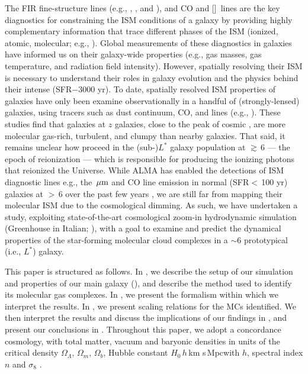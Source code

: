 \IfFileExists{emulateapjlegacy.cls}{\documentclass[iop]{emulateapjlegacy}}{\documentclass[iop]{emulateapj}}
\begin{document}
The FIR fine-structure lines (e.g., \cii, \nii, and \oiii), and CO and [\ci]~lines are the key diagnostics for
constraining the ISM conditions of a galaxy by
providing highly complementary information that trace different phases of the ISM (ionized,
atomic, molecular; e.g., \citealt{Scoville74a, Rubin85a, Malhotra01a}).
Global measurements of these diagnostics in \highz galaxies
have informed us on their galaxy-wide properties (e.g.,
gas masses, gas temperature, and radiation field intensity).
However, spatially resolving their ISM is necessary to understand their roles in galaxy evolution and
the physics behind their intense \SF (SFR$-$3000\,\Msun\,yr\pmOne).
To date, spatially resolved ISM properties of \highz galaxies
have only been examine observationally in a handful of (strongly-lensed)
galaxies, using tracers such as
dust continuum, CO, and \cii lines (e.g., \citealt{Swinbank11a, Hodge15a, Ferkinhoff15a, Hodge16a, Leung19a}).
These studies find that galaxies at $z$ galaxies, close to the peak of cosmic \SF, are more
molecular gas-rich, turbulent, and clumpy than nearby galaxies.
That said, it remains unclear how \SF proceed in the (sub-)$L^*$ galaxy population at \z$\gtrsim$\,6 ---
the epoch of reionization  ---
which is responsible for producing the
ionizing photons that reionized the Universe.
While ALMA has enabled the detections of
ISM diagnostic lines e.g., the \,$\mbox{$\mu$m}$ and CO line emission in
normal (SFR$<$\,100\,\Msun\,yr\pmOne) galaxies at \z$>$\,6 over the past few years \citep[e.g.,][]{Odorico18a, Carniani18b},
we are still far from mapping their molecular ISM due to the cosmological dimming.
As such, we have undertaken a study, exploiting
state-of-the-art cosmological zoom-in hydrodynamic simulation
 (Greenhouse in Italian; \citealt{Pallottini17a, Pallottini17b}), with a goal to examine
and predict the dynamical properties of the star-forming molecular cloud complexes in a \z$\sim$6 prototypical (i.e., $L^*$)
galaxy. %

This paper is structured as follows.
In , we describe the setup of our simulation and properties of our main galaxy (\flower),
and describe the method used to identify its molecular gas complexes.
In , we present the formalism within which we interpret the results.
In , we present scaling relations for the MCs identified. 
We then interpret the results   %
and discuss the implications of our findings in ,
and present our conclusions in .
Throughout this paper, we adopt a concordance cosmology, with total matter, vacuum and baryonic densities
in units of the critical density $\Omega_{\Lambda}$, $\Omega_m$, $\Omega_b$,
Hubble constant $H_0$\,$h$\,km s\pmOne\,Mpc\pmOne with $h$,
spectral index $n$ and $\sigma_8$ \citep{Planck14a}.
\end{document}
